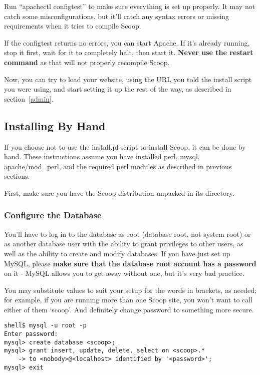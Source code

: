 Run ``apachectl configtest'' to make sure everything is set up properly.  It may not catch some misconfigurations, but it'll catch any syntax errors or missing requirements when it tries to compile Scoop.

If the configtest returns no errors, you can start Apache.  If it's already running, stop it first, wait for it to completely halt, then start it.  {\bf Never use the restart command} as that will not properly recompile Scoop.

Now, you can try to load your website, using the URL you told the install script you were using, and start setting it up the rest of the way, as described in section~\ref{admin}.

\subsection{Installing By Hand}
\label{by-hand}

If you choose not to use the install.pl script to install Scoop, it can be done by hand.  These instructions assume you have installed perl, mysql, apache/mod\_perl, and the required perl modules as described in previous sections.

First, make sure you have the Scoop distribution unpacked in its directory.

\subsubsection{Configure the Database}
\label{manual-db}

You'll have to log in to the database as root (database root, not system root) or as another database user with the ability to grant privileges to other users, as well as the ability to create and modify databases.  If you have just set up MySQL, please {\bf make sure that the database root account has a password} on it - MySQL allows you to get away without one, but it's very bad practice.

You may substitute values to suit your setup for the words in \latexhtml{$<$}{<}brackets\latexhtml{$>$}{>}, as needed; for example, if you are running more than one Scoop site, you won't want to call either of them `scoop'.  And definitely change \latexhtml{$<$}{<}password\latexhtml{$>$}{>} to something more secure.

\begin{verbatim}
shell$ mysql -u root -p
Enter password: 
mysql> create database <scoop>;
mysql> grant insert, update, delete, select on <scoop>.* 
    -> to <nobody>@<localhost> identified by '<password>';
mysql> exit
\end{verbatim}

